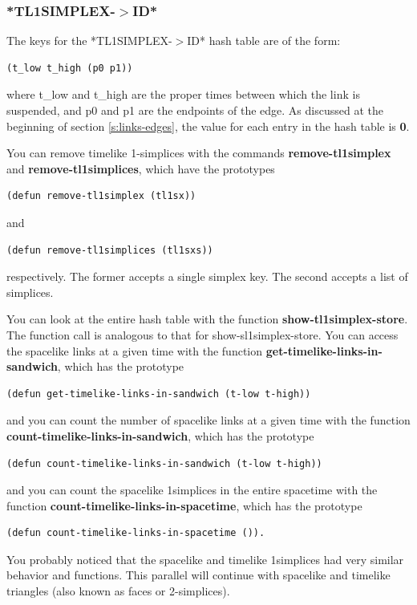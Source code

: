 \message{ !name(programmers_guide.tex)}\documentclass[12pt]{article}
\begin{document}
\subsubsection{*TL1SIMPLEX-$>$ID*}
\label{sss:tl1simplex:id}

The keys for the *TL1SIMPLEX-$>$ID* hash table are of the form:
\begin{lstlisting}
(t_low t_high (p0 p1))
\end{lstlisting}
where t\_low and t\_high are the proper times between which the link
is suspended, and p0 and p1 are the endpoints of the edge. As
discussed at the beginning of section \ref{s:links-edges}, the value
for each entry in the hash table is \textbf{0}.

You can remove timelike 1-simplices with the commands
\textbf{remove-tl1simplex} and \textbf{remove-tl1simplices}, which
have the prototypes
\begin{lstlisting}
(defun remove-tl1simplex (tl1sx))
\end{lstlisting}
and 
\begin{lstlisting}
(defun remove-tl1simplices (tl1sxs))
\end{lstlisting}
respectively. The former accepts a single simplex key. The second
accepts a list of simplices.

You can look at the entire hash table with the function
\textbf{show-tl1simplex-store}. The function call is analogous to that
for show-sl1simplex-store. You can access the spacelike links at a
given time with the function \textbf{get-timelike-links-in-sandwich},
which has the prototype
\begin{lstlisting}
(defun get-timelike-links-in-sandwich (t-low t-high))
\end{lstlisting}
and you can count the number of spacelike links at a given time with
the function \textbf{count-timelike-links-in-sandwich}, which has the
prototype
\begin{lstlisting}
(defun count-timelike-links-in-sandwich (t-low t-high))
\end{lstlisting}
and you can count the spacelike 1simplices in the entire spacetime
with the function \textbf{count-timelike-links-in-spacetime}, which
has the prototype
\begin{lstlisting}
(defun count-timelike-links-in-spacetime ()).
\end{lstlisting}

You probably noticed that the spacelike and timelike 1simplices had
very similar behavior and functions. This parallel will continue with
spacelike and timelike triangles (also known as faces or 2-simplices).
\end{document}
